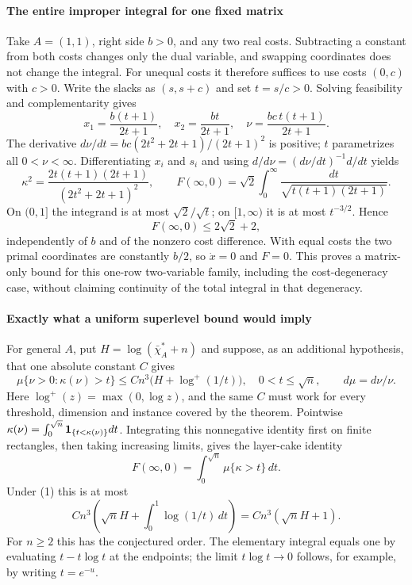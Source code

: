 \documentclass[11pt]{article}
\begin{document}
\paragraph{The entire improper integral for one fixed matrix}
Take $A=(1,1)$, right side $b>0$, and any two real costs. Subtracting a constant from both costs changes only the dual variable, and swapping coordinates does not change the integral. For unequal costs it therefore suffices to use costs $(0,c)$ with $c>0$. Write the slacks as $(s,s+c)$ and set $t=s/c>0$. Solving feasibility and complementarity gives
\[
 x_1=\frac{b(t+1)}{2t+1},\quad x_2=\frac{bt}{2t+1},\quad
 \nu=\frac{bc\,t(t+1)}{2t+1}.
\]
The derivative $d\nu/dt=bc(2t^2+2t+1)/(2t+1)^2$ is positive; $t$ parametrizes all $0<\nu<\infty$. Differentiating $x_i$ and $s_i$ and using $d/d\nu=(d\nu/dt)^{-1}d/dt$ yields
\[
 \kappa^2=\frac{2t(t+1)(2t+1)}{(2t^2+2t+1)^2},\qquad
 F(\infty,0)=\sqrt2\int_0^\infty\frac{dt}{\sqrt{t(t+1)(2t+1)}}.
\]
On $(0,1]$ the integrand is at most $\sqrt2/\sqrt t$; on $[1,\infty)$ it is at most $t^{-3/2}$. Hence
\[
 F(\infty,0)\leq2\sqrt2+2,
\]
independently of $b$ and of the nonzero cost difference. With equal costs the two primal coordinates are constantly $b/2$, so $\dot x=0$ and $F=0$. This proves a matrix-only bound for this one-row two-variable family, including the cost-degeneracy case, without claiming continuity of the total integral in that degeneracy.

\paragraph{Exactly what a uniform superlevel bound would imply}
For general $A$, put $H=\log(\bar\chi_A^*+n)$ and suppose, as an additional hypothesis, that one absolute constant $C$ gives
\[
 \mu\{\nu>0:\kappa(\nu)>t\}
 \leq Cn^3\bigl(H+\log^+(1/t)\bigr),\quad 0<t\leq\sqrt n,
 \qquad d\mu=d\nu/\nu.
 \tag{1}
\]
Here $\log^+(z)=\max(0,\log z)$, and the same $C$ must work for every threshold, dimension and instance covered by the theorem. Pointwise $\kappa(\nu)=\int_0^{\sqrt n}{\bf1}_{\{t<\kappa(\nu)\}}dt$. Integrating this nonnegative identity first on finite rectangles, then taking increasing limits, gives the layer-cake identity
\[
 F(\infty,0)=\int_0^{\sqrt n}\mu\{\kappa>t\}\,dt.
\]
Under (1) this is at most
\[
 Cn^3\left(\sqrt n H+\int_0^1\log(1/t)\,dt\right)
 =Cn^3(\sqrt n H+1).
\]
For $n\geq2$ this has the conjectured order. The elementary integral equals one by evaluating $t-t\log t$ at the endpoints; the limit $t\log t\to0$ follows, for example, by writing $t=e^{-u}$.
\end{document}
